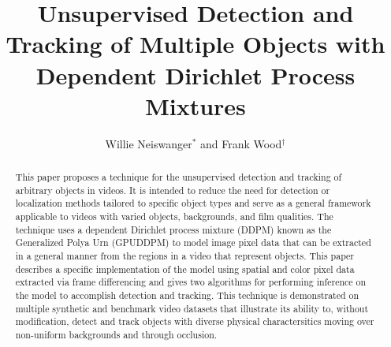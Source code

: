 \documentclass[twocolumn, final]{svjour3}
\begin{document}

\title{Unsupervised Detection and Tracking of Multiple Objects with Dependent Dirichlet Process Mixtures}



\author{Willie Neiswanger$^{*}$ and Frank Wood$^{\dagger}$}



\date{}  %

\maketitle






\begin{abstract}
This paper proposes a technique for the unsupervised detection and tracking of arbitrary objects in videos. It is intended to reduce the need for detection or localization methods tailored to specific object types and serve as a general framework applicable to videos with varied objects, backgrounds, and film qualities. The technique uses a dependent Dirichlet process mixture (DDPM) known as the Generalized Polya Urn (GPUDDPM) to model image pixel data that can be extracted in a general manner from the regions in a video that represent objects. This paper describes a specific implementation of the model using spatial and color pixel data extracted via frame differencing and gives two algorithms for performing inference on the model to accomplish detection and tracking. This technique is demonstrated on multiple synthetic and benchmark video datasets that illustrate its ability to, without modification, detect and track objects with diverse physical charactersitics moving over non-uniform backgrounds and through occlusion.
\end{abstract}
\end{document}
